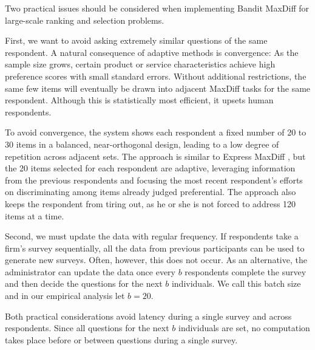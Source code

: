 \documentclass[nonblindrev]{informs3}
\begin{document}
Two practical issues should be considered when implementing Bandit MaxDiff for large-scale ranking and selection problems. 

First, we want to avoid asking extremely similar questions of the same respondent. A natural consequence of adaptive methods is convergence: As the sample size grows, certain product or service characteristics achieve high preference scores with small standard errors. Without additional restrictions, the same few items will eventually be drawn into adjacent MaxDiff tasks for the same respondent. Although this is statistically most efficient, it upsets human respondents. 

To avoid convergence, the system shows each respondent a fixed number of 20 to 30 items in a balanced, near-orthogonal design, leading to a low degree of repetition across adjacent sets. The approach is similar to Express MaxDiff \citep{wirth2012largeset}, but the 20 items selected for each respondent are adaptive, leveraging information from the previous respondents and focusing the most recent respondent's efforts on discriminating among items already judged preferential. The approach also keeps the respondent from tiring out, as he or she is not forced to address 120 items at a time.

Second, we must update the data with regular frequency. If respondents take a firm's survey sequentially, all the data from previous participants can be used to generate new surveys. Often, however, this does not occur. As an alternative, the administrator can update the data once every $b$ respondents complete the survey and then decide the questions for the next $b$ individuals. We call this batch size and in our empirical analysis let $b=20$.

Both practical considerations avoid latency during a single survey and across respondents. Since all questions for the next $b$ individuals are set, no computation takes place before or between questions during a single survey.
\end{document}
